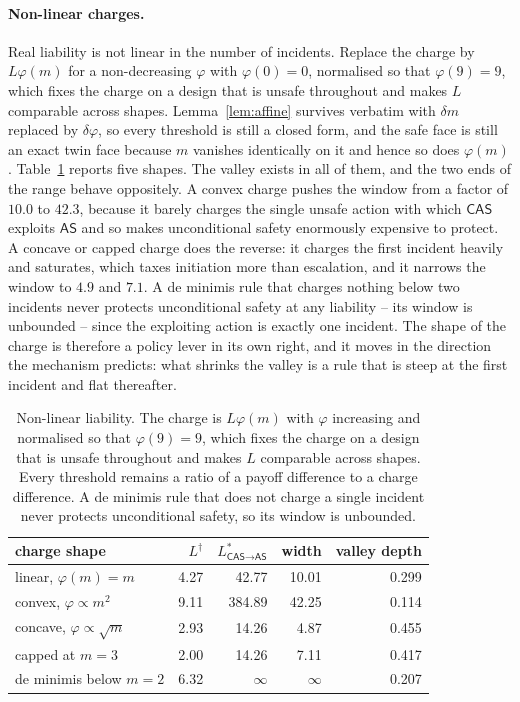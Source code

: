 \documentclass[pdflatex]{sn-jnl}
\theoremstyle{thmstyleone}
\theoremstyle{thmstylethree}
\theoremstyle{thmstyletwo}
\newcommand{\AS}{\textsf{AS}}
\newcommand{\CAS}{\textsf{CAS}}
\begin{document}
\paragraph{Non-linear charges.}
Real liability is not linear in the number of incidents. Replace the charge by
$L\varphi(m)$ for a non-decreasing $\varphi$ with $\varphi(0)=0$,
normalised so that $\varphi(9)=9$, which fixes the charge on a design that is
unsafe throughout and makes $L$ comparable across shapes. Lemma~\ref{lem:affine}
survives verbatim with $\delta m$ replaced by $\delta\varphi$, so every
threshold is still a closed form, and the safe face is still an exact twin
face because $m$ vanishes identically on it and hence so does $\varphi(m)$.
Table~\ref{tab:charges} reports five shapes. The valley exists in all of them,
and the two ends of the range behave oppositely. A convex charge pushes the
window from a factor of $10.0$ to $42.3$, because it barely charges the single
unsafe action with which $\CAS$ exploits $\AS$ and so makes unconditional
safety enormously expensive to protect. A concave or capped charge does the
reverse: it charges the first incident heavily and saturates, which taxes
initiation more than escalation, and it narrows the window to $4.9$ and $7.1$.
A de minimis rule that charges nothing below two incidents never protects
unconditional safety at any liability -- its window is unbounded -- since the
exploiting action is exactly one incident. The shape of the charge is
therefore a policy lever in its own right, and it moves in the direction the
mechanism predicts: what shrinks the valley is a rule that is steep at the
first incident and flat thereafter.

\begin{table}[!ht]
\centering
\caption{Non-linear liability. The charge is $L\varphi(m)$ with $\varphi$ increasing and normalised so that $\varphi(9)=9$, which fixes the charge on a design that is unsafe throughout and makes $L$ comparable across shapes. Every threshold remains a ratio of a payoff difference to a charge difference. A de minimis rule that does not charge a single incident never protects unconditional safety, so its window is unbounded.}
\label{tab:charges}
\begin{tabular}{lrrrr}
\toprule
charge shape & $L^{\dagger}$ & $L^{*}_{\CAS\to\AS}$ & width & valley depth \\
\midrule
linear, $\varphi(m)=m$ & 4.27 & 42.77 & 10.01 & 0.299 \\
convex, $\varphi\propto m^{2}$ & 9.11 & 384.89 & 42.25 & 0.114 \\
concave, $\varphi\propto\sqrt{m}$ & 2.93 & 14.26 & 4.87 & 0.455 \\
capped at $m=3$ & 2.00 & 14.26 & 7.11 & 0.417 \\
de minimis below $m=2$ & 6.32 & $\infty$ & $\infty$ & 0.207 \\
\bottomrule
\end{tabular}
\end{table}
\end{document}
